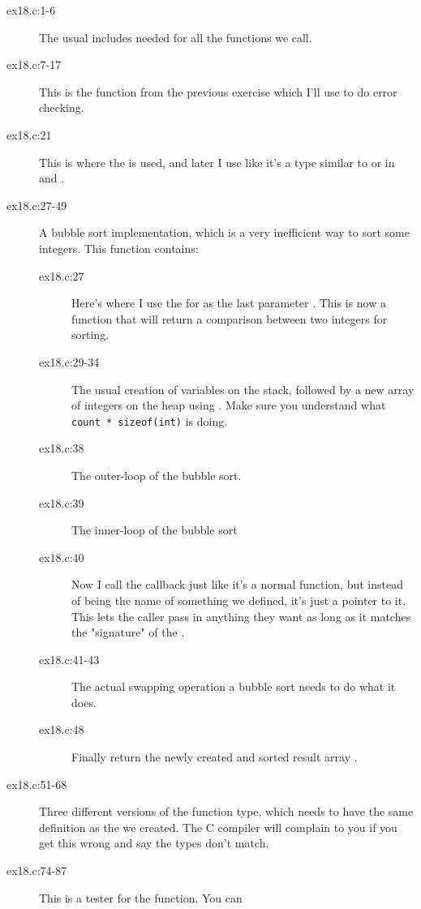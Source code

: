 \begin{description}
\item[ex18.c:1-6] The usual includes needed for all the functions we call.
\item[ex18.c:7-17] This is the  function from the previous exercise
    which I'll use to do error checking.
\item[ex18.c:21] This is where the  is used, and later I use 
     like it's a type similar to  or 
     in  and .
\item[ex18.c:27-49] A bubble sort implementation, which is a very inefficient way
    to sort some integers.  This function contains:
    \begin{description}
    \item[ex18.c:27] Here's where I use the  for 
        as the last parameter .  This is now a function that will
        return a comparison between two integers for sorting.
    \item[ex18.c:29-34] The usual creation of variables on the stack, followed by
    a new array of integers on the heap using .  Make sure you
    understand what \verb|count * sizeof(int)| is doing.
    \item[ex18.c:38] The outer-loop of the bubble sort.
    \item[ex18.c:39] The inner-loop of the bubble sort
    \item[ex18.c:40] Now I call the  callback just like it's a normal
        function, but instead of being the name of something we defined, 
        it's just a pointer to it.  This lets the caller pass in anything
        they want as long as it matches the "signature" of the 
        .
    \item[ex18.c:41-43] The actual swapping operation a bubble sort needs to do what it
        does.
    \item[ex18.c:48] Finally return the newly created and sorted result array .
    \end{description}
\item[ex18.c:51-68] Three different versions of the  function type,
    which needs to have the same definition as the  we created.
    The C compiler will complain to you if you get this wrong and say the types don't
    match.
\item[ex18.c:74-87] This is a tester for the  function.  You can 

\end{description}
